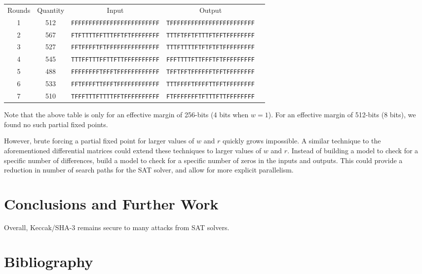 \documentclass[10pt,twocolumn,twoside]{pnas-new}
\begin{document}
\begin{tabular}{c c c c c} \label{tab:f:p:1}
    Rounds & Quantity & Input & Output \\
    1 & 512 & \texttt{FFFFFFFFFFFFFFFFFFFFFFFFF} & \texttt{TFFFFFFFFFFFFFFFFFFFFFFFF} \\
    2 & 567 & \texttt{FTFTTTTFFTTTFFTFTFFFFFFFF} & \texttt{TTTFTFFTFTTTFTFFTFFFFFFFF} \\
    3 & 527 & \texttt{FFTFFFFTFTFFFFFFFFFFFFFFF} & \texttt{TTTFTTTTFTFTFTFTFFFFFFFFF} \\
    4 & 545 & \texttt{TTTFFTTTFFTTFTTFFFFFFFFFF} & \texttt{FFFTTTTFTTFFFTFTFFFFFFFFF} \\
    5 & 488 & \texttt{FFFFFFFFTFFFTFFFFFFFFFFFF} & \texttt{TFFTFFTFFFFFFTFFTFFFFFFFF} \\
    6 & 533 & \texttt{FFTFFFFTTFFFTFFFFFFFFFFFF} & \texttt{TTTFFFFTFFFFTTFFTFFFFFFFF} \\
    7 & 510 & \texttt{TFFFTTTFTTTTFFTFFFFFFFFFF} & \texttt{FTFFFFFFFTFTTTFTTFFFFFFFF} \\
\end{tabular}

Note that the above table is only for an effective margin of 256-bits (4 bits
when $w=1$). For an effective margin of 512-bits (8 bits), we found no such
partial fixed points.

However, brute forcing a partial fixed point for larger values of $w$ and $r$
quickly grows impossible. A similar technique to the aforementioned
differential matrices could extend these techniques to larger values of $w$
and $r$. Instead of building a model to check for a specific number of
differences, build a model to check for a specific number of zeros in
the inputs and outputs. This could provide a reduction in number of search
paths for the SAT solver, and allow for more explicit parallelism.



\section{Conclusions and Further Work} \label{sec:conclusion}

Overall, Keccak/SHA-3 remains secure to many attacks from SAT solvers.


\section{Bibliography} \label{sec:bibliography}


\end{document}
